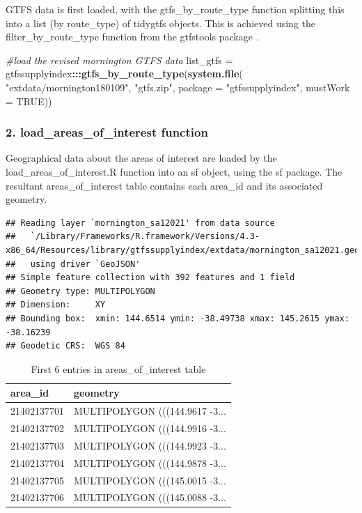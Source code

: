 \documentclass[preprint, 3p,
authoryear]{elsarticle} %
\newenvironment{Shaded}{\begin{snugshade}}{\end{snugshade}}
\newcommand{\AttributeTok}[1]{\textcolor[rgb]{0.13,0.29,0.53}{#1}}
\newcommand{\CommentTok}[1]{\textcolor[rgb]{0.56,0.35,0.01}{\textit{#1}}}
\newcommand{\ConstantTok}[1]{\textcolor[rgb]{0.56,0.35,0.01}{#1}}
\newcommand{\FunctionTok}[1]{\textcolor[rgb]{0.13,0.29,0.53}{\textbf{#1}}}
\newcommand{\NormalTok}[1]{#1}
\newcommand{\OtherTok}[1]{\textcolor[rgb]{0.56,0.35,0.01}{#1}}
\newcommand{\SpecialCharTok}[1]{\textcolor[rgb]{0.81,0.36,0.00}{\textbf{#1}}}
\newcommand{\StringTok}[1]{\textcolor[rgb]{0.31,0.60,0.02}{#1}}
\begin{document}
GTFS data is first loaded, with the gtfs\_by\_route\_type function
splitting this into a list (by route\_type) of tidygtfs objects. This is
achieved using the filter\_by\_route\_type function from the gtfstools
package \citep{filter_GTFS_by_mode}.

\begin{Shaded}
\begin{Highlighting}[]
\CommentTok{\#load the revised mornington GTFS data}
\NormalTok{list\_gtfs }\OtherTok{=}\NormalTok{ gtfssupplyindex}\SpecialCharTok{:::}\FunctionTok{gtfs\_by\_route\_type}\NormalTok{(}\FunctionTok{system.file}\NormalTok{(}
  \StringTok{"extdata/mornington180109"}\NormalTok{,}
  \StringTok{"gtfs.zip"}\NormalTok{, }
  \AttributeTok{package =} \StringTok{"gtfssupplyindex"}\NormalTok{, }
  \AttributeTok{mustWork =} \ConstantTok{TRUE}\NormalTok{))}
\end{Highlighting}
\end{Shaded}

\hypertarget{load_areas_of_interest-function}{%
\subsubsection{2. load\_areas\_of\_interest
function}\label{load_areas_of_interest-function}}

Geographical data about the areas of interest are loaded by the
load\_areas\_of\_interest.R function into an sf object, using the sf
\citep{R-sf} package. The resultant areas\_of\_interest table contains
each area\_id and its associated geometry.

\begin{verbatim}
## Reading layer `mornington_sa12021' from data source 
##   `/Library/Frameworks/R.framework/Versions/4.3-x86_64/Resources/library/gtfssupplyindex/extdata/mornington_sa12021.geojson' 
##   using driver `GeoJSON'
## Simple feature collection with 392 features and 1 field
## Geometry type: MULTIPOLYGON
## Dimension:     XY
## Bounding box:  xmin: 144.6514 ymin: -38.49738 xmax: 145.2615 ymax: -38.16239
## Geodetic CRS:  WGS 84
\end{verbatim}

\begin{table}

\caption{\label{tab:load_ABS data}First 6 entries in areas_of_interest table}
\centering
\begin{tabular}[t]{l|l}
\hline
area\_id & geometry\\
\hline
21402137701 & MULTIPOLYGON (((144.9617 -3...\\
\hline
21402137702 & MULTIPOLYGON (((144.9916 -3...\\
\hline
21402137703 & MULTIPOLYGON (((144.9923 -3...\\
\hline
21402137704 & MULTIPOLYGON (((144.9878 -3...\\
\hline
21402137705 & MULTIPOLYGON (((145.0015 -3...\\
\hline
21402137706 & MULTIPOLYGON (((145.0088 -3...\\
\hline
\end{tabular}
\end{table}
\end{document}
